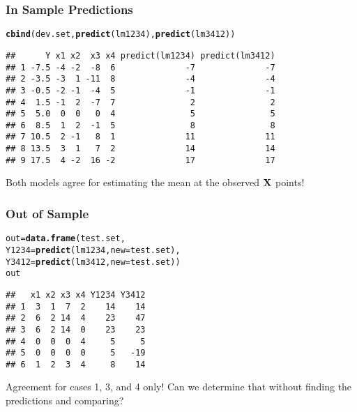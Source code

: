 \documentclass[handout]{beamer}\usepackage[]{graphicx}\usepackage[]{color}
\makeatletter
\newcommand{\hlstd}[1]{\textcolor[rgb]{0.345,0.345,0.345}{#1}}%
\newcommand{\hlkwb}[1]{\textcolor[rgb]{0.69,0.353,0.396}{#1}}%
\newcommand{\hlkwc}[1]{\textcolor[rgb]{0.333,0.667,0.333}{#1}}%
\newcommand{\hlkwd}[1]{\textcolor[rgb]{0.737,0.353,0.396}{\textbf{#1}}}%
\newenvironment{kframe}{%
 \def\at@end@of@kframe{}%
 \ifinner\ifhmode%
  \def\at@end@of@kframe{\end{minipage}}%
  \begin{minipage}{\columnwidth}%
 \fi\fi%
 \def\FrameCommand##1{\hskip\@totalleftmargin \hskip-\fboxsep
 \colorbox{shadecolor}{##1}\hskip-\fboxsep
     \hskip-\linewidth \hskip-\@totalleftmargin \hskip\columnwidth}%
 \MakeFramed {\advance\hsize-\width
   \@totalleftmargin\z@ \linewidth\hsize
   \@setminipage}}%
 {\par\unskip\endMakeFramed%
 \at@end@of@kframe}
\newenvironment{knitrout}{}{} %
\makeatother
\begin{document}
\begin{frame}[fragile] \frametitle{In Sample Predictions}

\begin{knitrout}
\color{fgcolor}\begin{kframe}
\begin{alltt}
\hlkwd{cbind}\hlstd{(dev.set,} \hlkwd{predict}\hlstd{(lm1234),} \hlkwd{predict}\hlstd{(lm3412))}
\end{alltt}
\begin{verbatim}
##      Y x1 x2  x3 x4 predict(lm1234) predict(lm3412)
## 1 -7.5 -4 -2  -8  6              -7              -7
## 2 -3.5 -3  1 -11  8              -4              -4
## 3 -0.5 -2 -1  -4  5              -1              -1
## 4  1.5 -1  2  -7  7               2               2
## 5  5.0  0  0   0  4               5               5
## 6  8.5  1  2  -1  5               8               8
## 7 10.5  2 -1   8  1              11              11
## 8 13.5  3  1   7  2              14              14
## 9 17.5  4 -2  16 -2              17              17
\end{verbatim}
\end{kframe}
\end{knitrout}

Both models agree for estimating the mean at the observed $\mathbf{X}$ points!
\end{frame}
\begin{frame} [fragile] \frametitle{Out of Sample}



\begin{knitrout}
\color{fgcolor}\begin{kframe}
\begin{alltt}
\hlstd{out} \hlkwb{=} \hlkwd{data.frame}\hlstd{(test.set,}
      \hlkwc{Y1234}\hlstd{=}\hlkwd{predict}\hlstd{(lm1234,} \hlkwc{new}\hlstd{=test.set),}
      \hlkwc{Y3412}\hlstd{=}\hlkwd{predict}\hlstd{(lm3412,} \hlkwc{new}\hlstd{=test.set))}
\hlstd{out}
\end{alltt}
\begin{verbatim}
##   x1 x2 x3 x4 Y1234 Y3412
## 1  3  1  7  2    14    14
## 2  6  2 14  4    23    47
## 3  6  2 14  0    23    23
## 4  0  0  0  4     5     5
## 5  0  0  0  0     5   -19
## 6  1  2  3  4     8    14
\end{verbatim}
\end{kframe}
\end{knitrout}

\pause
Agreement for cases 1, 3, and 4 only!  Can we determine that without
finding the predictions and comparing?
\end{frame}
\end{document}
